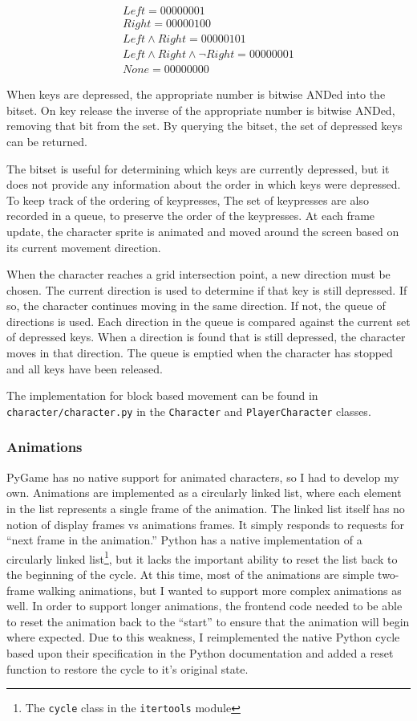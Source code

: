 \documentclass[11pt]{article}
\begin{document}
\begin{align*}
Left = 00000001 \\ 
Right = 00000100 \\
Left \land Right = 00000101 \\
Left \land Right \land \neg Right = 00000001 \\
None = 00000000
\end{align*}

When keys are depressed, the appropriate number is bitwise ANDed into the bitset.  On key release the inverse of the appropriate number is bitwise ANDed, removing that bit from the set.  By querying the bitset, the set of depressed keys can be returned.

The bitset is useful for determining which keys are currently depressed, but it does not provide any information about the order in which keys were depressed.  To keep track of the ordering of keypresses, The set of keypresses are also recorded in a queue, to preserve the order of the keypresses.  At each frame update, the character sprite is animated and moved around the screen based on its current movement direction.  

When the character reaches a grid intersection point, a new direction must be chosen.  The current direction is used to determine if that key is still depressed. If so, the character continues moving in the same direction.  If not, the queue of directions is used. Each direction in the queue is compared against the current set of depressed keys.  When a direction is found that is still depressed, the character moves in that direction.  The queue is emptied when the character has stopped and all keys have been released.

The implementation for block based movement can be found in \texttt{character/character.py} in the \texttt{Character} and \texttt{PlayerCharacter} classes.

\subsubsection{Animations}

PyGame has no native support for animated characters, so I had to develop my own.  Animations are implemented as a circularly linked list, where each element in the list represents a single frame of the animation.  The linked list itself has no notion of display frames vs animations frames.  It simply responds to requests for ``next frame in the animation.''  Python has a native implementation of a circularly linked list\footnote{The \texttt{cycle} class in the \texttt{itertools} module}, but it lacks the important ability to reset the list back to the beginning of the cycle.  At this time, most of the animations are simple two-frame walking animations, but I wanted to support more complex animations as well.  In order to support longer animations, the frontend code needed to be able to reset the animation back to the ``start'' to ensure that the animation will begin where expected.  Due to this weakness, I reimplemented the native Python cycle based upon their specification in the Python documentation \cite{PythonCycle} and added a reset function to restore the cycle to it's original state. 
\end{document}
